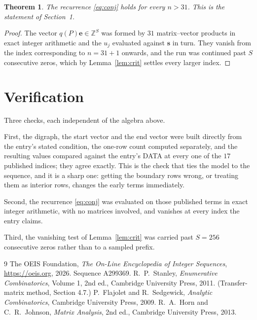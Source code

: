 \documentclass[11pt,a4paper]{article}
\theoremstyle{plain}
\newtheorem{theorem}{Theorem}
\theoremstyle{definition}
\begin{document}
\begin{theorem}
The recurrence \eqref{eq:conj} holds for every $n>31$. This is the statement of
Section~1.
\end{theorem}

\begin{proof}
The vector $q(P)\mathbf{e}\in\mathbb{Z}^{S}$ was formed by $31$ matrix--vector
products in exact integer arithmetic and the $u_j$ evaluated against $\mathbf{s}$ in turn.
They vanish from the index corresponding to $n=31+1$ onwards, and the run was continued
past $S$ consecutive zeros, which by Lemma~\ref{lem:crit} settles every larger index.
\end{proof}

\section{Verification}

Three checks, each independent of the algebra above.

First, the digraph, the start vector and the end vector were built directly from the
entry's stated condition, the one-row count computed separately, and the resulting values
compared against the entry's DATA at every one of the $17$ published indices; they
agree exactly. This is the check that ties the model to the sequence, and it is a sharp one:
getting the boundary rows wrong, or treating them as interior rows, changes the early terms
immediately.

Second, the recurrence \eqref{eq:conj} was evaluated on those published terms in exact
integer arithmetic, with no matrices involved, and vanishes at every index the entry claims.

Third, the vanishing test of Lemma~\ref{lem:crit} was carried past $S=256$ consecutive
zeros rather than to a sampled prefix.

\begin{thebibliography}{9}
 The OEIS Foundation, \emph{The On-Line Encyclopedia of Integer
Sequences}, \url{https://oeis.org}, 2026. Sequence A299369.
 R.~P.~Stanley, \emph{Enumerative Combinatorics}, Volume 1, 2nd ed.,
Cambridge University Press, 2011. (Transfer-matrix method, Section 4.7.)
 P.~Flajolet and R.~Sedgewick, \emph{Analytic Combinatorics}, Cambridge
University Press, 2009.
 R.~A.~Horn and C.~R.~Johnson, \emph{Matrix Analysis}, 2nd ed., Cambridge
University Press, 2013.
\end{thebibliography}
\end{document}
